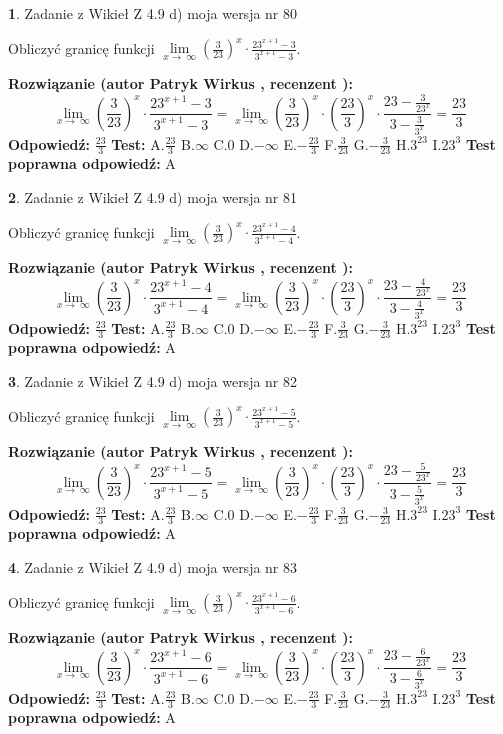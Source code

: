 \documentclass[12pt, a4paper]{article}
\theoremstyle{definition} %
\newtheorem{zad}{}
\newcommand{\zadStart}[1]{\begin{zad}#1\newline}
\newcommand{\zadStop}{\end{zad}}
\newcommand{\rozwStart}[2]{\noindent \textbf{Rozwiązanie (autor #1 , recenzent #2): }\newline}
\newcommand{\rozwStop}{\newline}
\newcommand{\odpStart}{\noindent \textbf{Odpowiedź:}\newline}
\newcommand{\odpStop}{\newline}
\newcommand{\testStart}{\noindent \textbf{Test:}\newline}
\newcommand{\testStop}{\newline}
\newcommand{\kluczStart}{\noindent \textbf{Test poprawna odpowiedź:}\newline}
\newcommand{\kluczStop}{\newline}
\begin{document}
\zadStart{Zadanie z Wikieł Z 4.9 d) moja wersja nr 80}


Obliczyć granicę funkcji  $\lim\limits_{x\to\ \infty}(\frac{3}{23})^{x}\cdot\frac{23^{x+1}-3}{3^{x+1}-3}$.
\zadStop
\rozwStart{Patryk Wirkus}{}
$$\lim\limits_{x\to\ \infty}(\frac{3}{23})^{x}\cdot\frac{23^{x+1}-3}{3^{x+1}-3}=\lim\limits_{x\to\ \infty}(\frac{3}{23})^{x}\cdot(\frac{23}{3})^{x} \cdot \frac{23-\frac{3}{23^{x}}}{3-\frac{3}{3^{x}}} = \frac{23}{3}$$
\rozwStop
\odpStart
$\frac{23}{3}$
\odpStop
\testStart
A.$\frac{23}{3}$ B.$\infty$ C.$0$ D.$-\infty$ E.$-\frac{23}{3}$
F.$\frac{3}{23}$ G.$-\frac{3}{23}$
H.$3^{23}$
I.$23^{3}$
\testStop
\kluczStart
A
\kluczStop



\zadStart{Zadanie z Wikieł Z 4.9 d) moja wersja nr 81}


Obliczyć granicę funkcji  $\lim\limits_{x\to\ \infty}(\frac{3}{23})^{x}\cdot\frac{23^{x+1}-4}{3^{x+1}-4}$.
\zadStop
\rozwStart{Patryk Wirkus}{}
$$\lim\limits_{x\to\ \infty}(\frac{3}{23})^{x}\cdot\frac{23^{x+1}-4}{3^{x+1}-4}=\lim\limits_{x\to\ \infty}(\frac{3}{23})^{x}\cdot(\frac{23}{3})^{x} \cdot \frac{23-\frac{4}{23^{x}}}{3-\frac{4}{3^{x}}} = \frac{23}{3}$$
\rozwStop
\odpStart
$\frac{23}{3}$
\odpStop
\testStart
A.$\frac{23}{3}$ B.$\infty$ C.$0$ D.$-\infty$ E.$-\frac{23}{3}$
F.$\frac{3}{23}$ G.$-\frac{3}{23}$
H.$3^{23}$
I.$23^{3}$
\testStop
\kluczStart
A
\kluczStop



\zadStart{Zadanie z Wikieł Z 4.9 d) moja wersja nr 82}


Obliczyć granicę funkcji  $\lim\limits_{x\to\ \infty}(\frac{3}{23})^{x}\cdot\frac{23^{x+1}-5}{3^{x+1}-5}$.
\zadStop
\rozwStart{Patryk Wirkus}{}
$$\lim\limits_{x\to\ \infty}(\frac{3}{23})^{x}\cdot\frac{23^{x+1}-5}{3^{x+1}-5}=\lim\limits_{x\to\ \infty}(\frac{3}{23})^{x}\cdot(\frac{23}{3})^{x} \cdot \frac{23-\frac{5}{23^{x}}}{3-\frac{5}{3^{x}}} = \frac{23}{3}$$
\rozwStop
\odpStart
$\frac{23}{3}$
\odpStop
\testStart
A.$\frac{23}{3}$ B.$\infty$ C.$0$ D.$-\infty$ E.$-\frac{23}{3}$
F.$\frac{3}{23}$ G.$-\frac{3}{23}$
H.$3^{23}$
I.$23^{3}$
\testStop
\kluczStart
A
\kluczStop



\zadStart{Zadanie z Wikieł Z 4.9 d) moja wersja nr 83}


Obliczyć granicę funkcji  $\lim\limits_{x\to\ \infty}(\frac{3}{23})^{x}\cdot\frac{23^{x+1}-6}{3^{x+1}-6}$.
\zadStop
\rozwStart{Patryk Wirkus}{}
$$\lim\limits_{x\to\ \infty}(\frac{3}{23})^{x}\cdot\frac{23^{x+1}-6}{3^{x+1}-6}=\lim\limits_{x\to\ \infty}(\frac{3}{23})^{x}\cdot(\frac{23}{3})^{x} \cdot \frac{23-\frac{6}{23^{x}}}{3-\frac{6}{3^{x}}} = \frac{23}{3}$$
\rozwStop
\odpStart
$\frac{23}{3}$
\odpStop
\testStart
A.$\frac{23}{3}$ B.$\infty$ C.$0$ D.$-\infty$ E.$-\frac{23}{3}$
F.$\frac{3}{23}$ G.$-\frac{3}{23}$
H.$3^{23}$
I.$23^{3}$
\testStop
\kluczStart
A
\kluczStop
\end{document}
